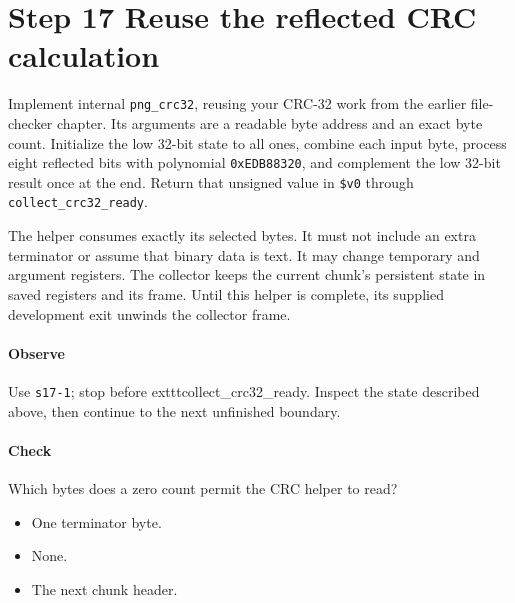 \section{Step 17 Reuse the reflected CRC calculation}\label{png-collect-s17}
Implement internal \texttt{png\_crc32}, reusing your CRC-32 work from the earlier file-checker chapter. Its arguments are a readable byte address and an exact byte count. Initialize the low 32-bit state to all ones, combine each input byte, process eight reflected bits with polynomial \texttt{0xEDB88320}, and complement the low 32-bit result once at the end. Return that unsigned value in \texttt{\$v0} through \texttt{collect\_crc32\_ready}.

The helper consumes exactly its selected bytes. It must not include an extra terminator or assume that binary data is text. It may change temporary and argument registers. The collector keeps the current chunk's persistent state in saved registers and its frame. Until this helper is complete, its supplied development exit unwinds the collector frame.

\paragraph{Observe} Use \texttt{s17-1}; stop before 	exttt{collect\_crc32\_ready}. Inspect the state described above, then continue to the next unfinished boundary.

\paragraph{Check} Which bytes does a zero count permit the CRC helper to read?
\begin{itemize}
\item[A.] One terminator byte.
\item[B.] None.
\item[C.] The next chunk header.
\end{itemize}
